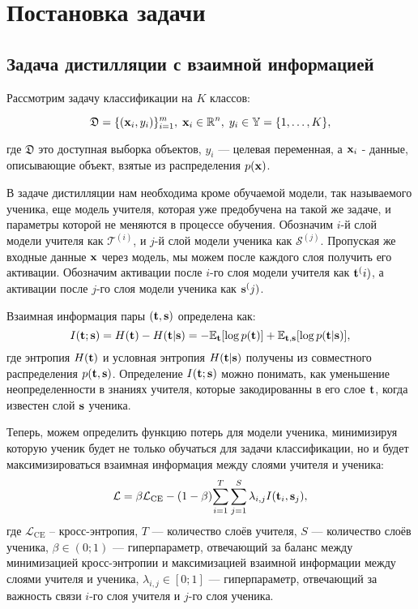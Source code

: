 \section{Постановка задачи}

\subsection{Задача дистилляции с взаимной информацией}

Рассмотрим задачу классификации на $K$ классов:

$$\mathfrak{D}  = \{(\bold{x}_i, y_i)\}_{i=1}^{m},\; \bold{x}_i \in \mathbb{R}^n,\; y_i \in \mathbb{Y}  = \{1, \dots, K\},$$

где $\mathfrak{D}$ это доступная выборка объектов, $y_i$ --- целевая переменная, а $\bold{x}_i$ - данные, описывающие объект, взятые из распределения $p(\bold{x})$.

В задаче дистилляции нам необходима кроме обучаемой модели, так называемого ученика, еще модель учителя,
которая уже предобучена на такой же задаче, и параметры которой не меняются в процессе обучения.
Обозначим $i$-й слой модели учителя как $\mathcal{T}^{(i)}$, и $j$-й слой модели ученика как $\mathcal{S}^{(j)}$. Пропуская же входные данные $\bold{x}$ через модель,
мы можем после каждого слоя получить его активации.
Обозначим активации после $i$-го слоя модели учителя как $\bold{t}^(i)$, а активации после $j$-го слоя модели ученика как $\bold{s}^(j)$.

Взаимная информация \cite{Ahn_2019_CVPR} пары $(\bold{t}, \bold{s})$ определена как:
$$ I(\bold{t}; \bold{s}) = H(\bold{t}) - H(\bold{t} | \bold{s}) =  -\mathbb{E}_{\bold{t}}[\log{p(\bold{t})}] + \mathbb{E}_{\bold{t},\bold{s}}[\log{p(\bold{t}|\bold{s})}],$$
где энтропия $H(\bold{t})$ и условная энтропия $H(\bold{t}|\bold{s})$ получены из совместного распределения $p(\bold{t},\bold{s})$.
Определение $I(\bold{t}; \bold{s})$ можно понимать, как уменьшение неопределенности в знаниях учителя, которые закодированны в его слое $\bold{t}$,
когда известен слой $\bold{s}$ ученика.

Теперь, можем определить функцию потерь для модели ученика, минимизируя которую ученик будет не только обучаться для задачи классификации,
но и будет максимизироваться взаимная информация между слоями учителя и ученика:
$$\mathcal{L} = \beta \mathcal{L}_\text{CE} - (1 - \beta){\sum_{i=1}^T \sum_{j=1}^S \lambda_{i, j}I(\bold{t}_{i}, \bold{s}_{j})},$$
где $\mathcal{L}_\text{CE}$ -- кросс-энтропия, $T$ --- количество слоёв учителя, $S$ --- количество слоёв ученика, $\beta \in (0;1)$ --- гиперпараметр,
отвечающий за баланс между минимизацией кросс-энтропии и максимизацией взаимной информации между слоями учителя и ученика, $\lambda_{i, j} \in [0;1]$ ---
гиперпараметр, отвечающий за важность связи $i$-го слоя учителя и $j$-го слоя ученика.

